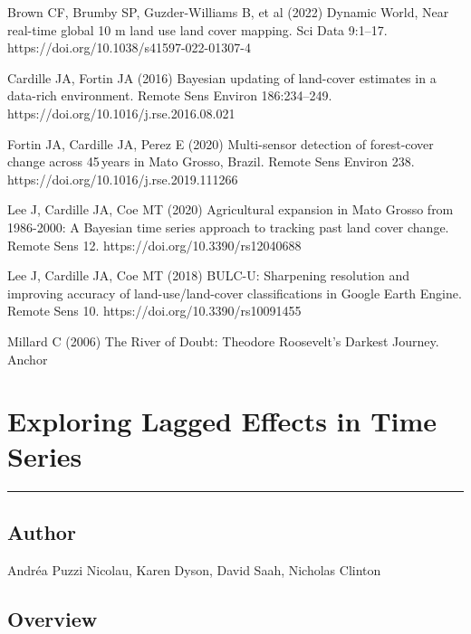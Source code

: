 \documentclass[
  letterpaper,
  DIV=11,
  numbers=noendperiod]{scrreprt}
\begin{document}

Brown CF, Brumby SP, Guzder-Williams B, et al (2022) Dynamic World, Near
real-time global 10 m land use land cover mapping. Sci Data 9:1--17.
https://doi.org/10.1038/s41597-022-01307-4

Cardille JA, Fortin JA (2016) Bayesian updating of land-cover estimates
in a data-rich environment. Remote Sens Environ 186:234--249.
https://doi.org/10.1016/j.rse.2016.08.021

Fortin JA, Cardille JA, Perez E (2020) Multi-sensor detection of
forest-cover change across 45\,years in Mato Grosso, Brazil. Remote Sens
Environ 238. https://doi.org/10.1016/j.rse.2019.111266

Lee J, Cardille JA, Coe MT (2020) Agricultural expansion in Mato Grosso
from 1986-2000: A Bayesian time series approach to tracking past land
cover change. Remote Sens 12. https://doi.org/10.3390/rs12040688

Lee J, Cardille JA, Coe MT (2018) BULC-U: Sharpening resolution and
improving accuracy of land-use/land-cover classifications in Google
Earth Engine. Remote Sens 10. https://doi.org/10.3390/rs10091455

Millard C (2006) The River of Doubt: Theodore Roosevelt's Darkest
Journey. Anchor

\hypertarget{exploring-lagged-effects-in-time-series}{%
\chapter{Exploring Lagged Effects in Time
Series~}\label{exploring-lagged-effects-in-time-series}}

\begin{center}\rule{0.5\linewidth}{0.5pt}\end{center}

\hypertarget{author-14}{%
\section*{Author}\label{author-14}}


Andréa Puzzi Nicolau, Karen Dyson, David Saah, Nicholas Clinton

\hypertarget{overview-16}{%
\section*{Overview}\label{overview-16}}

\end{document}
